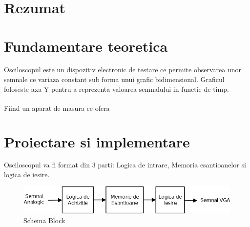 \documentclass[10pt,a4paper]{article}
\begin{document}




\tableofcontents

\clearpage

\section{Rezumat}
\clearpage




\section{Fundamentare teoretica}
\paragraph{}
Osciloscopul este un dispozitiv electronic de testare ce permite 
observarea unor semnale ce variaza constant sub forma unui grafic bidimensional.
Graficul foloseste axa Y pentru a reprezenta valoarea semnalului in functie de timp.

\paragraph{}
Fiind un aparat de masura ce ofera 

\clearpage

\section{Proiectare si implementare}

Osciloscopul va fi format din 3 parti: Logica de intrare, Memoria esantioanelor si logica de iesire.

\begin{figure}[h]
\centering
\includegraphics[width=320pt]{block_diagram}
\caption{Schema Block}
\label{fig:block_diagram}
\end{figure}
\end{document}
